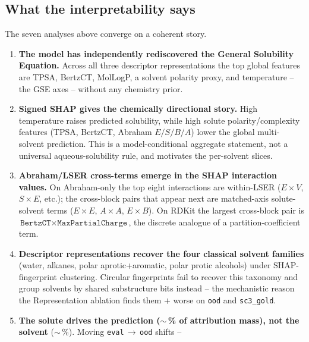 \subsection{What the interpretability says}
\label{sec:interp_summary}

The seven analyses above converge on a coherent story.

\begin{enumerate}
  \item \textbf{The model has independently rediscovered the General
        Solubility Equation.}  Across all three descriptor
        representations the top global features are TPSA, BertzCT,
        MolLogP, a solvent polarity proxy, and temperature -- the GSE
        axes -- without any chemistry prior.
  \item \textbf{Signed SHAP gives the chemically directional story.}
        High temperature raises predicted solubility, while high
        solute polarity/complexity features (TPSA, BertzCT, Abraham
        \(E/S/B/A\)) lower the global multi-solvent prediction.  This
        is a model-conditional aggregate statement, not a universal
        aqueous-solubility rule, and motivates the per-solvent slices.
  \item \textbf{Abraham/LSER cross-terms emerge in the SHAP interaction
        values.}  On Abraham-only the top eight interactions are
        within-LSER ($E\!\times\!V$, $S\!\times\!E$, etc.); the
        cross-block pairs that appear next are matched-axis
        solute-solvent terms ($E\!\times\!E$, $A\!\times\!A$,
        $E\!\times\!B$).  On RDKit the largest cross-block pair is
        $\texttt{BertzCT}\!\times\!\texttt{MaxPartialCharge}$, the
        discrete analogue of a partition-coefficient term.
  \item \textbf{Descriptor representations recover the four classical
        solvent families} (water, alkanes, polar aprotic+aromatic,
        polar protic alcohols) under SHAP-fingerprint clustering.
        Circular fingerprints fail to recover this taxonomy and group
        solvents by shared substructure bits instead -- the
        mechanistic reason the Representation ablation finds them
        \(+\) \RMSE{} worse on \texttt{ood} and
        \texttt{sc3\_gold}.
  \item \textbf{The solute drives the prediction (\(\sim\)\,\%
        of attribution mass), not the solvent} (\(\sim\)\,\%).
        Moving \texttt{eval}\,\(\to\)\,\texttt{ood} shifts --

\end{enumerate}
